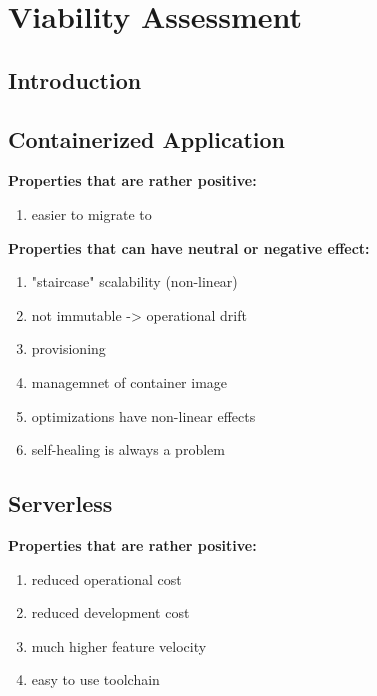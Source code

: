 \chapter{Viability Assessment}\label{chp:viabilityAssessment}


\section{Introduction}


\section{Containerized Application}

\textbf{Properties that are rather positive:}
\begin{enumerate}
    \item easier to migrate to
\end{enumerate}

\textbf{Properties that can have neutral or negative effect:}
\begin{enumerate}
    \item "staircase" scalability (non-linear)
    \item not immutable -> operational drift
    \item provisioning
    \item managemnet of container image
    \item optimizations have non-linear effects
    \item self-healing is always a problem
\end{enumerate}

\section{Serverless}

\textbf{Properties that are rather positive:}
\begin{enumerate}
    \item reduced operational cost
    \item reduced development cost
    \item much higher feature velocity
    \item easy to use toolchain
\end{enumerate}

